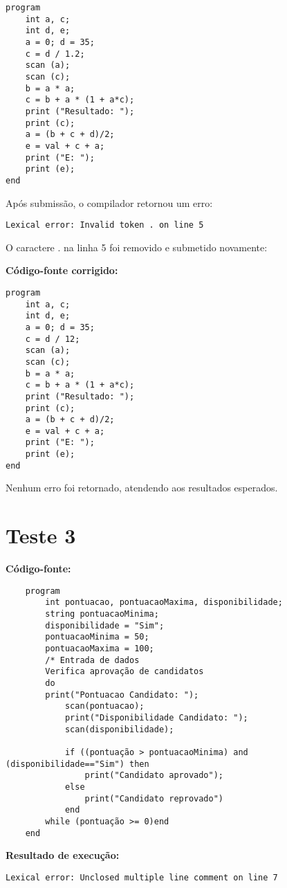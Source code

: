\begin{lstlisting}
program
	int a, c;
	int d, e;
	a = 0; d = 35;
	c = d / 1.2;
	scan (a);
	scan (c);
	b = a * a;
	c = b + a * (1 + a*c);
	print ("Resultado: ");
	print (c);
	a = (b + c + d)/2;
	e = val + c + a;
	print ("E: ");
	print (e);
end
\end{lstlisting}

Após submissão, o compilador retornou um erro:

\begin{lstlisting}
Lexical error: Invalid token . on line 5
\end{lstlisting}

O caractere . na linha 5 foi removido e submetido novamente:

\textbf{Código-fonte corrigido:}

\begin{lstlisting}
program
	int a, c;
	int d, e;
	a = 0; d = 35;
	c = d / 12;
	scan (a);
	scan (c);
	b = a * a;
	c = b + a * (1 + a*c);
	print ("Resultado: ");
	print (c);
	a = (b + c + d)/2;
	e = val + c + a;
	print ("E: ");
	print (e);
end
\end{lstlisting}

Nenhum erro foi retornado, atendendo aos resultados esperados.

\section{\textbf{Teste 3}}
    
        \textbf{Código-fonte:}
        
        \begin{lstlisting}
    program
    	int pontuacao, pontuacaoMaxima, disponibilidade;
    	string pontuacaoMinima;
    	disponibilidade = "Sim";
    	pontuacaoMinima = 50;
    	pontuacaoMaxima = 100;
    	/* Entrada de dados
    	Verifica aprovação de candidatos
    	do
    	print("Pontuacao Candidato: ");
    		scan(pontuacao);
    		print("Disponibilidade Candidato: ");
    		scan(disponibilidade);
    
    		if ((pontuação > pontuacaoMinima) and (disponibilidade=="Sim") then
    			print("Candidato aprovado");
    		else
    			print("Candidato reprovado")
    		end
    	while (pontuação >= 0)end
    end
        \end{lstlisting}
        
        \textbf{Resultado de execução:}
        
        
 \begin{lstlisting}
Lexical error: Unclosed multiple line comment on line 7
\end{lstlisting}

